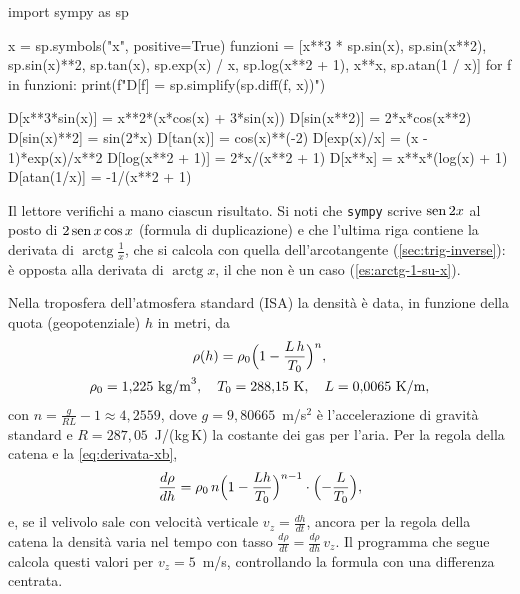 \begin{python}
import sympy as sp

x = sp.symbols("x", positive=True)
funzioni = [x**3 * sp.sin(x), sp.sin(x**2), sp.sin(x)**2, sp.tan(x),
            sp.exp(x) / x, sp.log(x**2 + 1), x**x, sp.atan(1 / x)]
for f in funzioni:
    print(f"D[{f}] = {sp.simplify(sp.diff(f, x))}")
\end{python}
\begin{risultato}
D[x**3*sin(x)] = x**2*(x*cos(x) + 3*sin(x))
D[sin(x**2)] = 2*x*cos(x**2)
D[sin(x)**2] = sin(2*x)
D[tan(x)] = cos(x)**(-2)
D[exp(x)/x] = (x - 1)*exp(x)/x**2
D[log(x**2 + 1)] = 2*x/(x**2 + 1)
D[x**x] = x**x*(log(x) + 1)
D[atan(1/x)] = -1/(x**2 + 1)
\end{risultato}

Il lettore verifichi a mano ciascun risultato. Si noti che \texttt{sympy} scrive
$\operatorname{sen}2x$ al posto di $2\operatorname{sen} x\cos x$ (formula di duplicazione) e che l'ultima riga contiene
la derivata di $\operatorname{arctg}\frac1x$, che si calcola con quella dell'arcotangente
(\cref{sec:trig-inverse}): è opposta alla derivata di $\operatorname{arctg}x$, il che non è
un caso (\cref{es:arctg-1-su-x}).

\begin{idea}
Nella troposfera dell'atmosfera standard (ISA) la densità è data, in funzione della quota
(geopotenziale) $h$ in metri, da
\begin{gather*}
  \rho(h)=\rho_{0}\Bigl(1-\frac{L\,h}{T_{0}}\Bigr)^{n},\\
  \rho_{0}=1{,}225\ \text{kg/m}^{3},\quad T_{0}=288{,}15\ \text{K},\quad L=0{,}0065\ \text{K/m},
\end{gather*}
con $n=\frac{g}{RL}-1\approx4{,}2559$, dove $g=9{,}80665$~m/s$^{2}$ è l'accelerazione di
gravità standard e $R=287{,}05$~J/(kg\,K) la costante dei gas per l'aria. Per la regola
della catena e la \eqref{eq:derivata-xb},
\[
  \frac{d\rho}{dh}=\rho_{0}\,n\Bigl(1-\frac{Lh}{T_{0}}\Bigr)^{n-1}\cdot\Bigl(-\frac L{T_{0}}\Bigr),
\]
e, se il velivolo sale con velocità verticale $v_{z}=\frac{dh}{dt}$, ancora per la regola
della catena la densità varia nel tempo con tasso $\frac{d\rho}{dt}=\frac{d\rho}{dh}\,v_{z}$.
Il programma che segue calcola questi valori per $v_{z}=5$~m/s, controllando la formula
con una differenza centrata.
\end{idea}

